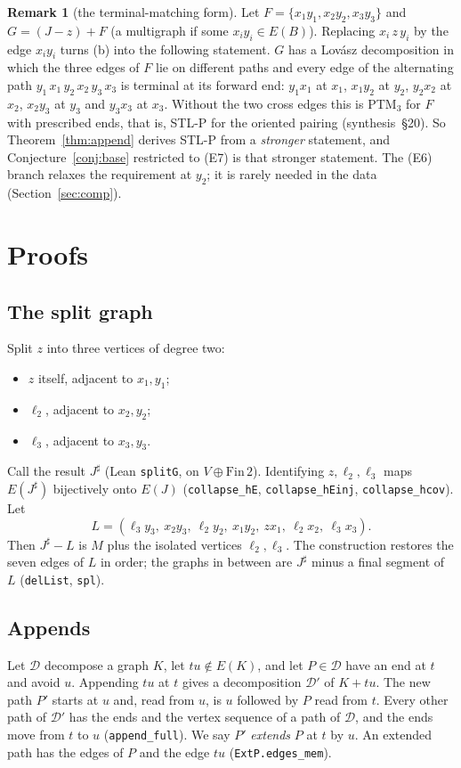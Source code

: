 \documentclass[11pt]{amsart}
\theoremstyle{definition}
\newtheorem{remark}[theorem]{Remark}
\newcommand{\cD}{\mathcal D}
\newcommand{\sh}{{\sharp}}
\begin{document}
\begin{remark}[the terminal-matching form]\label{rem:ptm}
Let $F=\{x_1y_1,x_2y_2,x_3y_3\}$ and $G=(J-z)+F$ (a multigraph if some $x_iy_i\in E(B)$). Replacing
$x_i\,z\,y_i$ by the edge $x_iy_i$ turns (b) into the following statement. $G$ has a Lov\'asz
decomposition in which the three edges of $F$ lie on different paths and every edge of the
alternating path $y_1\,x_1\,y_2\,x_2\,y_3\,x_3$ is terminal at its forward end: $y_1x_1$ at $x_1$,
$x_1y_2$ at $y_2$, $y_2x_2$ at $x_2$, $x_2y_3$ at $y_3$ and $y_3x_3$ at $x_3$. Without the two cross
edges this is PTM$_3$ for $F$ with prescribed ends, that is, STL-P for the oriented pairing
\cite{STL,TM} (synthesis~\S20). So Theorem~\ref{thm:append} derives STL-P from a
\emph{stronger} statement, and Conjecture~\ref{conj:base} restricted to (E7) is that stronger
statement. The (E6) branch relaxes the requirement at $y_2$; it is rarely needed in the data
(Section~\ref{sec:comp}).
\end{remark}

\section{Proofs}\label{sec:proof}

\subsection*{The split graph}
Split $z$ into three vertices of degree two:
\begin{itemize}
\item $z$ itself, adjacent to $x_1,y_1$;
\item $\ell_2$, adjacent to $x_2,y_2$;
\item $\ell_3$, adjacent to $x_3,y_3$.
\end{itemize}
Call the result $J^\sh$ (Lean \texttt{splitG}, on $V\oplus\mathrm{Fin}\,2$). Identifying
$z,\ell_2,\ell_3$ maps $E(J^\sh)$ bijectively onto $E(J)$ (\texttt{collapse\_hE},
\texttt{collapse\_hEinj}, \texttt{collapse\_hcov}). Let
\[
L=(\ell_3y_3,\ x_2y_3,\ \ell_2y_2,\ x_1y_2,\ zx_1,\ \ell_2x_2,\ \ell_3x_3).
\]
Then $J^\sh-L$ is $M$ plus the isolated vertices $\ell_2,\ell_3$. The construction restores the
seven edges of $L$ in order; the graphs in between are $J^\sh$ minus a final segment of $L$
(\texttt{delList}, \texttt{spl}).

\subsection*{Appends}
Let $\cD$ decompose a graph $K$, let $tu\notin E(K)$, and let $P\in\cD$ have an end at $t$ and
avoid $u$. Appending $tu$ at $t$ gives a decomposition $\cD'$ of $K+tu$. The new path $P'$ starts
at $u$ and, read from $u$, is $u$ followed by $P$ read from $t$. Every other path of $\cD'$ has
the ends and the vertex sequence of a path of $\cD$, and the ends move from $t$ to $u$
(\texttt{append\_full}). We say $P'$ \emph{extends} $P$ at $t$ by $u$. An extended path has the
edges of $P$ and the edge $tu$ (\texttt{ExtP.edges\_mem}).
\end{document}
